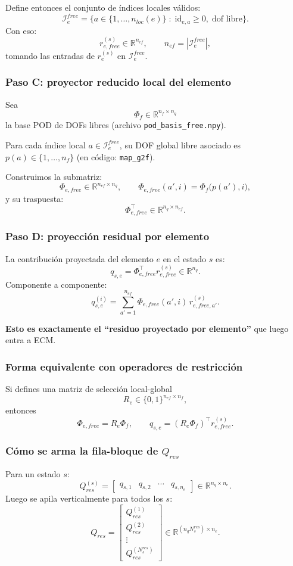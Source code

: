 \documentclass[11pt,a4paper]{article}
\begin{document}
Define entonces el conjunto de índices locales válidos:
\[
\mathcal I_{e}^{free}
=
\{a\in\{1,\dots,n_{loc}(e)\}\;:\;\mathrm{id}_{e,a}\ge 0,\;\text{dof libre}\}.
\]
Con eso:
\[
r_{e,free}^{(s)}\in\mathbb{R}^{n_{ef}},\qquad
n_{ef}=|\mathcal I_{e}^{free}|,
\]
tomando las entradas de $r_e^{(s)}$ en $\mathcal I_{e}^{free}$.

\subsubsection*{Paso C: proyector reducido local del elemento}
Sea
\[
\Phi_f\in\mathbb{R}^{n_f\times n_q}
\]
la base POD de DOFs libres (archivo \texttt{pod\_basis\_free.npy}).

Para cada índice local $a\in\mathcal I_{e}^{free}$, su DOF global libre asociado
es $p(a)\in\{1,\dots,n_f\}$ (en código: \texttt{map\_g2f}).

Construimos la submatriz:
\[
\Phi_{e,free}
\in\mathbb{R}^{n_{ef}\times n_q},
\qquad
\Phi_{e,free}(a',i)=\Phi_f\big(p(a'),i\big),
\]
y su traspuesta:
\[
\Phi_{e,free}^\top \in\mathbb{R}^{n_q\times n_{ef}}.
\]

\subsubsection*{Paso D: proyección residual por elemento}
La contribución proyectada del elemento $e$ en el estado $s$ es:
\[
q_{s,e}=
\Phi_{e,free}^\top r_{e,free}^{(s)}
\in\mathbb{R}^{n_q}.
\]
Componente a componente:
\[
q_{s,e}^{(i)}
=
\sum_{a'=1}^{n_{ef}}
\Phi_{e,free}(a',i)\,r_{e,free,a'}^{(s)}.
\]

\textbf{Esto es exactamente el ``residuo proyectado por elemento''} que luego entra a ECM.

\subsubsection*{Forma equivalente con operadores de restricción}
Si defines una matriz de selección local-global
\[
R_e\in\{0,1\}^{n_{ef}\times n_f},
\]
entonces
\[
\Phi_{e,free}=R_e\Phi_f,\qquad
q_{s,e}=(R_e\Phi_f)^\top r_{e,free}^{(s)}.
\]

\subsubsection*{Cómo se arma la fila-bloque de $Q_{res}$}
Para un estado $s$:
\[
Q_{res}^{(s)}=
\begin{bmatrix}
q_{s,1} & q_{s,2} & \cdots & q_{s,n_e}
\end{bmatrix}
\in\mathbb{R}^{n_q\times n_e}.
\]
Luego se apila verticalmente para todos los $s$:
\[
Q_{res}=
\begin{bmatrix}
Q_{res}^{(1)}\\
Q_{res}^{(2)}\\
\vdots\\
Q_{res}^{(N_s^{res})}
\end{bmatrix}
\in\mathbb{R}^{(n_qN_s^{res})\times n_e}.
\]
\end{document}
